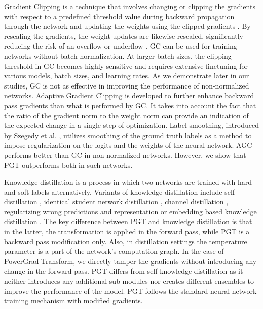\documentclass[runningheads]{llncs}
\begin{document}
Gradient Clipping \cite{pascanu2013difficulty} is a technique that involves changing or
clipping the gradients with respect to a predefined threshold value during backward
propagation through the network and updating the weights using the clipped gradients
\cite{zhang2019gradient}\cite{smith2020generalization}. By rescaling the gradients, the
weight updates are likewise rescaled, significantly reducing the risk of an overflow or
underflow \cite{pascanu2012understanding}. GC can be used for training networks without
batch-normalization. At larger batch sizes, the clipping threshold in GC becomes highly
sensitive and requires extensive finetuning for various models, batch sizes, and
learning rates. As we demonstrate later in our studies, GC is not as effective in
improving the performance of non-normalized networks. Adaptive Gradient Clipping
\cite{brock2021high} is developed to further enhance backward pass gradients than what
is performed by GC. It takes into account the fact that the ratio of the gradient norm
to the weight norm can provide an indication of the expected change in a single step of
optimization. Label smoothing, introduced by Szegedy et al.
\cite{szegedy2016rethinking}, utilizes smoothing of the ground truth labels as a method
to impose regularization on the logits and the weights of the neural network. AGC
performs better than GC in non-normalized networks. However, we show that PGT
outperforms both in such networks.

Knowledge distillation \cite{hinton2015distilling} is a process in which two networks
are trained with hard and soft labels alternatively. Variants of knowledge distillation
include self-distillation \cite{zhang2018deep}, identical student network distillation
\cite{furlanello2018born}, channel distillation \cite{ge2019distilling}, regularizing
wrong predictions \cite{yun2020regularizing} and representation or embedding based
knowledge distillation \cite{yao2018deep}\cite{aguilar2020knowledge}. The key difference between PGT and knowledge
distillation is that in the latter, the transformation is applied in the forward pass,
while PGT is a backward pass modification only. Also, in distillation settings the
temperature parameter is a part of the network's computation graph. In the case of
PowerGrad Transform, we directly tamper the gradients without introducing any change in
the forward pass. PGT differs from self-knowledge distillation as it neither introduces
any additional sub-modules nor creates different ensembles to improve the performance of
the model. PGT follows the standard neural network training mechanism with modified
gradients.
\end{document}
